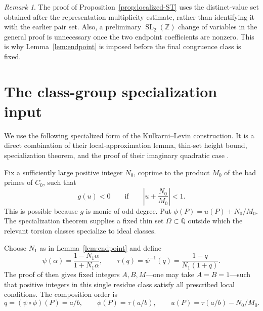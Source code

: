 \documentclass[11pt,reqno]{amsart}
\theoremstyle{definition}
\theoremstyle{remark}
\newtheorem{remark}[theorem]{Remark}
\newcommand{\Q}{\mathbb{Q}}
\newcommand{\Z}{\mathbb{Z}}
\newcommand{\SL}{\operatorname{SL}}
\begin{document}
\begin{remark}\label{rem:source-bookkeeping}
The proof of Proposition~\ref{prop:localized-ST} uses the distinct-value set obtained
after the representation-multiplicity estimate, rather than identifying it
with the earlier pair set.  Also, a preliminary \(\SL_2(\Z)\) change of
variables in the general proof is unnecessary once the two endpoint
coefficients are nonzero.  This is why Lemma~\ref{lem:endpoint} is imposed before
the final congruence class is fixed.
\end{remark}

\section{The class-group specialization input}\label{sec:KL}

We use the following specialized form of the Kulkarni--Levin construction.
It is a direct combination of their local-approximation lemma, thin-set height
bound, specialization theorem, and the proof of their imaginary quadratic
case \cite[Lemmas~3.1--3.2, Theorems~1.3 and~4.1]{KulkarniLevin2022}.

Fix a sufficiently large positive integer \(N_0\), coprime to the product
\(M_0\) of the bad primes of \(C_0\), such that
\begin{equation}\label{eq:negative-neighborhood}
  g(u)<0\qquad\text{if}\qquad
  \left|u+\frac{N_0}{M_0}\right|<1.
\end{equation}
This is possible because \(g\) is monic of odd degree.  Put
\(\phi(P)=u(P)+N_0/M_0\).  The specialization theorem supplies a fixed thin
set \(\Omega\subset\Q\) outside which the relevant torsion classes specialize
to ideal classes.

Choose \(N_1\) as in Lemma~\ref{lem:endpoint} and define
\begin{equation}\label{eq:mobius}
  \psi(\alpha)=\frac{1-N_1\alpha}{1+N_1\alpha},
  \qquad
  \tau(q)=\psi^{-1}(q)=\frac{1-q}{N_1(1+q)}.
\end{equation}
The proof of \cite[Lemma~3.1]{KulkarniLevin2022} then gives fixed integers
\(A,B,M\)---one may take \(A=B=1\)---such that positive integers in this
single residue class satisfy all prescribed local conditions.  The
composition order is
\begin{equation}\label{eq:composition-order}
  q=(\psi\circ\phi)(P)=a/b,
  \qquad
  \phi(P)=\tau(a/b),
  \qquad
  u(P)=\tau(a/b)-N_0/M_0.
\end{equation}
\end{document}
